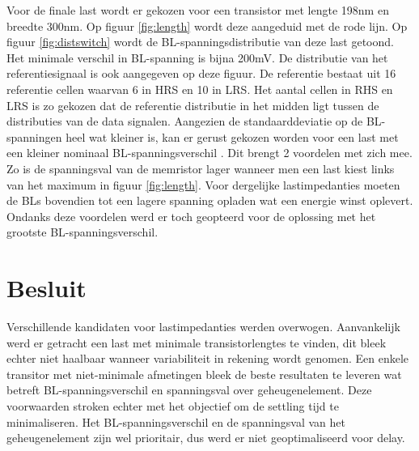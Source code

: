Voor de finale last wordt er gekozen voor een transistor met lengte 198nm en breedte 300nm. Op figuur \ref{fig:length} wordt deze aangeduid met de rode lijn. Op figuur \ref{fig:distswitch} wordt de BL-spanningsdistributie van deze last getoond. Het minimale verschil in BL-spanning is bijna 200mV. De distributie van het referentiesignaal is ook aangegeven op deze figuur. De referentie bestaat uit 16 referentie cellen waarvan 6 in HRS en 10 in LRS. Het aantal cellen in RHS en LRS is zo gekozen dat de referentie distributie in het midden ligt tussen de distributies van de data signalen. Aangezien de standaarddeviatie op de BL-spanningen heel wat kleiner is, kan er gerust gekozen worden voor een last met een kleiner nominaal BL-spanningsverschil \label{anderelast}. Dit brengt 2 voordelen met zich mee. Zo is de spanningsval van de memristor lager wanneer men een last kiest links van het maximum in figuur \ref{fig:length}. Voor dergelijke lastimpedanties moeten de BLs bovendien tot een lagere spanning opladen wat een energie winst oplevert. Ondanks deze voordelen werd er toch geopteerd voor de oplossing met het grootste BL-spanningsverschil.

\section{Besluit}
Verschillende kandidaten voor lastimpedanties werden overwogen. Aanvankelijk werd er getracht een last met minimale transistorlengtes te vinden, dit bleek echter niet haalbaar wanneer variabiliteit in rekening wordt genomen. Een enkele transitor met niet-minimale afmetingen bleek de beste resultaten te leveren wat betreft BL-spanningsverschil en spanningsval over geheugenelement. Deze voorwaarden stroken echter met het objectief om de settling tijd te minimaliseren. Het BL-spanningsverschil en de spanningsval van het geheugenelement zijn wel prioritair, dus werd er niet geoptimaliseerd voor delay.
